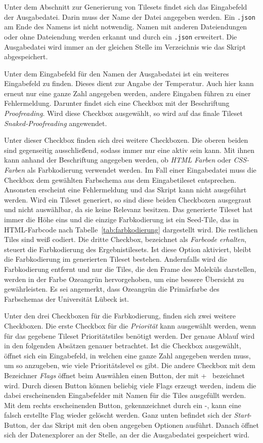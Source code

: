Unter dem Abschnitt zur Generierung von Tilesets findet sich das Eingabefeld der Ausgabedatei. Darin muss der Name der Datei angegeben werden. Ein \texttt{.json} am Ende des Namens ist nicht notwendig. Namen mit anderen Dateiendungen oder ohne Dateiendung werden erkannt und durch ein \texttt{.json} erweitert. Die Ausgabedatei wird immer an der gleichen Stelle im Verzeichnis wie das Skript abgespeichert.

Unter dem Eingabefeld für den Namen der Ausgabedatei ist ein weiteres Eingabefeld zu finden. Dieses dient zur Angabe der Temperatur. Auch hier kann erneut nur eine ganze Zahl angegeben werden, andere Eingaben führen zu einer Fehlermeldung. Darunter findet sich eine Checkbox mit der Beschriftung \emph{Proofreading}. Wird diese Checkbox ausgewählt, so wird auf das finale Tileset \emph{Snaked-Proofreading} angewendet.

Unter dieser Checkbox finden sich drei weitere Checkboxen. Die oberen beiden sind gegenseitig ausschließend, sodass immer nur eine aktiv sein kann. Mit ihnen kann anhand der Beschriftung angegeben werden, ob \emph{HTML Farben} oder \emph{CSS-Farben} als Farbkodierung verwendet werden. Im Fall einer Eingabedatei muss die Checkbox dem gewählten Farbschema aus dem Eingabetileset entsprechen. Ansonsten erscheint eine Fehlermeldung und das Skript kann nicht ausgeführt werden. Wird ein Tileset generiert, so sind diese beiden Checkboxen ausgegraut und nicht auswählbar, da sie keine Relevanz besitzen. Das generierte Tileset hat immer die Höhe eins und die einzige Farbkodierung ist ein Seed-Tile, das in HTML-Farbcode nach Tabelle~\ref{tab:farbkodierung} dargestellt wird. Die restlichen Tiles sind weiß codiert. Die dritte Checkbox, bezeichnet als \emph{Farbcode erhalten}, steuert die Farbkodierung des Ergebnistilesets. Ist diese Option aktiviert, bleibt die Farbkodierung im generierten Tileset bestehen. Andernfalls wird die Farbkodierung entfernt und nur die Tiles, die den Frame des Moleküls darstellen, werden in der Farbe Ozeangrün hervorgehoben, um eine bessere Übersicht zu gewährleisten. Es sei angemerkt, dass Ozeangrün die Primärfarbe des Farbschemas der Universität Lübeck ist.

Unter den drei Checkboxen für die Farbkodierung, finden sich zwei weitere Checkboxen. Die erste Checkbox für die \emph{Priorität} kann ausgewählt werden, wenn für das gegebene Tileset Prioritätstiles benötigt werden. Der genaue Ablauf wird in den folgenden Absätzen genauer betrachtet. Ist die Checkbox ausgewählt, öffnet sich ein Eingabefeld, in welchen eine ganze Zahl angegeben werden muss, um so anzugeben, wie viele Prioritätslevel es gibt. Die andere Checkbox mit dem Bezeichner \emph{Flags} öffnet beim Auswählen einen Button, der mit \glqq +\grqq~ bezeichnet wird. Durch diesen Button können beliebig viele Flags erzeugt werden, indem die dabei erscheinenden Eingabefelder mit Namen für die Tiles ausgefüllt werden. Mit dem rechts erscheinenden Button, gekennzeichnet durch ein \glqq -\grqq, kann eine falsch erstellte Flag wieder gelöscht werden. Ganz unten befindet sich der \emph{Start}-Button, der das Skript mit den oben angegeben Optionen ausführt. Danach öffnet sich der Datenexplorer an der Stelle, an der die Ausgabedatei gespeichert wird.

